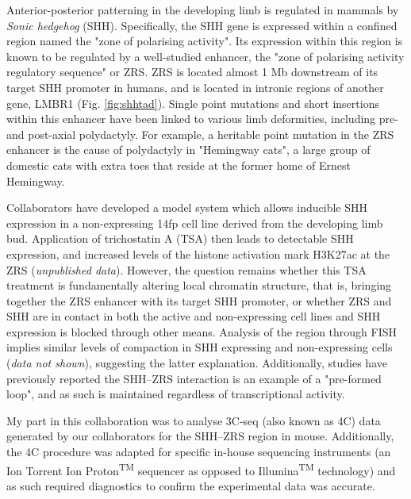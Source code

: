 \documentclass[a4paper,11pt,oneside]{book}
\begin{document}

Anterior-posterior patterning in the developing limb is regulated in mammals by \emph{Sonic hedgehog} (SHH).\cite{Anderson2012} Specifically, the SHH gene is expressed within a confined region named the "zone of polarising activity". Its expression within this region is known to be regulated by a well-studied enhancer, the "zone of polarising activity regulatory sequence" or ZRS.\cite{Hill2013a} ZRS is located almost 1 Mb downstream of its target SHH promoter in humans, and is located in intronic regions of another gene, LMBR1 (Fig. \ref{fig:shhtad}).\cite{Hill2013a, Laurell2012} Single point mutations and short insertions within this enhancer have been linked to various limb deformities, including pre- and post-axial polydactyly.\cite{Anderson2012, Lettice2008, Laurell2012} For example, a heritable point mutation in the ZRS enhancer is the cause of polydactyly in "Hemingway cats", a large group of domestic cats with extra toes that reside at the former home of Ernest Hemingway.\cite{Lettice2008}  

Collaborators have developed a model system which allows inducible SHH expression in a non-expressing 14fp cell line derived from the developing limb bud. Application of trichostatin A (TSA) then leads to detectable SHH expression, and increased levels of the histone activation mark H3K27ac at the ZRS (\emph{unpublished data}). However, the question remains whether this TSA treatment is fundamentally altering local chromatin structure, that is, bringing together the ZRS enhancer with its target SHH promoter, or whether ZRS and SHH are in contact in both the active and non-expressing cell lines and SHH expression is blocked through other means. Analysis of the region through FISH implies similar levels of compaction in SHH expressing and non-expressing cells (\emph{data not shown}), suggesting the latter explanation. Additionally, studies have previously reported the SHH--ZRS interaction is an example of a "pre-formed loop", and as such is maintained regardless of transcriptional activity.\cite{Bouwman2015a}

My part in this collaboration was to analyse 3C-seq (also known as 4C) data generated by our collaborators for the SHH--ZRS region in mouse. Additionally, the 4C procedure\cite{Stadhouders2013} was adapted for specific in-house sequencing instruments (an Ion Torrent Ion Proton\textsuperscript{TM} sequencer as opposed to Illumina\textsuperscript{TM} technology) and as such required diagnostics to confirm the experimental data was accurate. 
\end{document}
